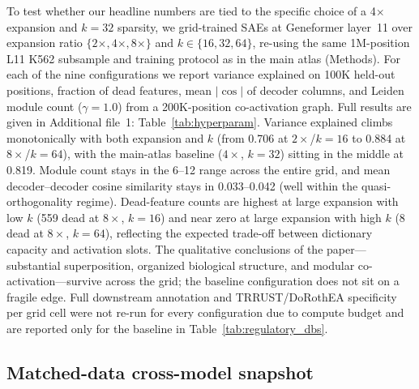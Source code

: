 \documentclass[onecolumn]{article}
\begin{document}
To test whether our headline numbers are tied to the specific choice of a 4$\times$ expansion and $k{=}32$ sparsity, we grid-trained SAEs at Geneformer layer~11 over expansion ratio $\{2\times, 4\times, 8\times\}$ and $k \in \{16, 32, 64\}$, re-using the same 1M-position L11 K562 subsample and training protocol as in the main atlas (Methods). For each of the nine configurations we report variance explained on 100K held-out positions, fraction of dead features, mean $|{\cos}|$ of decoder columns, and Leiden module count ($\gamma{=}1.0$) from a 200K-position co-activation graph. Full results are given in Additional file~1: Table~\ref{tab:hyperparam}. Variance explained climbs monotonically with both expansion and $k$ (from 0.706 at $2\times$/$k{=}16$ to 0.884 at $8\times$/$k{=}64$), with the main-atlas baseline ($4\times$, $k{=}32$) sitting in the middle at 0.819. Module count stays in the 6--12 range across the entire grid, and mean decoder--decoder cosine similarity stays in 0.033--0.042 (well within the quasi-orthogonality regime). Dead-feature counts are highest at large expansion with low $k$ (559 dead at $8\times$, $k{=}16$) and near zero at large expansion with high $k$ (8 dead at $8\times$, $k{=}64$), reflecting the expected trade-off between dictionary capacity and activation slots. The qualitative conclusions of the paper---substantial superposition, organized biological structure, and modular co-activation---survive across the grid; the baseline configuration does not sit on a fragile edge. Full downstream annotation and TRRUST/DoRothEA specificity per grid cell were not re-run for every configuration due to compute budget and are reported only for the baseline in Table~\ref{tab:regulatory_dbs}.

\subsection{Matched-data cross-model snapshot}
\label{sec:matched}
\end{document}

